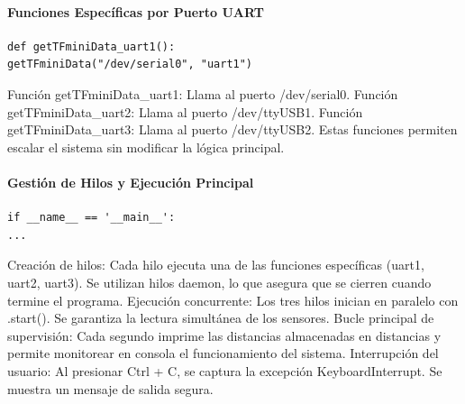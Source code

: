 \documentclass[12pt,a4paper]{article}
\begin{document}
\paragraph{Funciones Específicas por Puerto UART}

\begin{verbatim}
def getTFminiData_uart1():
getTFminiData("/dev/serial0", "uart1")
\end{verbatim}
Función getTFminiData\_uart1: Llama al puerto /dev/serial0. Función getTFminiData\_uart2: Llama al puerto /dev/ttyUSB1. Función getTFminiData\_uart3: Llama al puerto /dev/ttyUSB2. Estas funciones permiten escalar el sistema sin modificar la lógica principal.

\paragraph{Gestión de Hilos y Ejecución Principal}
\begin{verbatim}
if __name__ == '__main__':
...
\end{verbatim}
Creación de hilos: Cada hilo ejecuta una de las funciones específicas (uart1, uart2, uart3). Se utilizan hilos daemon, lo que asegura que se cierren cuando termine el programa. Ejecución concurrente: Los tres hilos inician en paralelo con .start(). Se garantiza la lectura simultánea de los sensores. Bucle principal de supervisión: Cada segundo imprime las distancias almacenadas en distancias y permite monitorear en consola el funcionamiento del sistema. Interrupción del usuario: Al presionar Ctrl + C, se captura la excepción KeyboardInterrupt. Se muestra un mensaje de salida segura.
\end{document}
